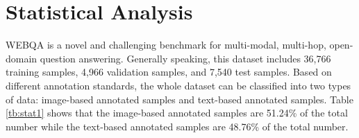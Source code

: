 \documentclass[nohyperref]{article}
\theoremstyle{plain}
\theoremstyle{definition}
\theoremstyle{remark}
\begin{document}






    \section{Statistical Analysis}\label{intro}
    WEBQA \cite{webqa} is a novel and challenging benchmark for multi-modal, multi-hop, open-domain question answering. Generally speaking, this dataset includes 36,766 training samples,  4,966 validation samples, and 7,540 test samples. Based on different annotation standards, the whole dataset can be classified into two types of data: image-based annotated samples and text-based annotated samples. Table \ref{tb:stat1} shows that the image-based annotated samples are 51.24\% of the total number while the text-based annotated samples are 48.76\% of the total number.
\end{document}

